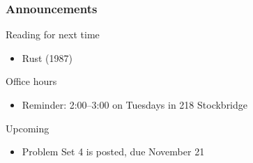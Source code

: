 \documentclass{beamer}
\begin{document}
\begin{frame}\frametitle{Announcements}
    Reading for next time
    \begin{itemize}
        \item Rust (1987)
    \end{itemize}
    \vspace{3ex}
    Office hours
    \begin{itemize}
    	\item Reminder: 2:00--3:00 on Tuesdays in 218 Stockbridge
    \end{itemize}
    \vspace{3ex}
    Upcoming
    \begin{itemize}
        \item Problem Set 4 is posted, due November 21
    \end{itemize}
\end{frame}
\end{document}

